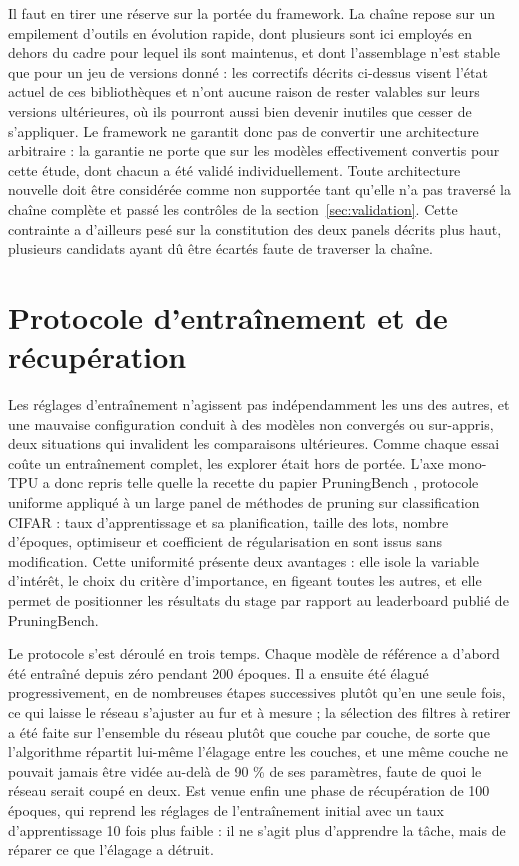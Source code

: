\documentclass[11pt,a4paper]{report}
\begin{document}
Il faut en tirer une réserve sur la portée du framework. La chaîne repose sur un empilement d'outils en évolution rapide, dont plusieurs sont ici employés en dehors du cadre pour lequel ils sont maintenus, et dont l'assemblage n'est stable que pour un jeu de versions donné : les correctifs décrits ci-dessus visent l'état actuel de ces bibliothèques et n'ont aucune raison de rester valables sur leurs versions ultérieures, où ils pourront aussi bien devenir inutiles que cesser de s'appliquer. Le framework ne garantit donc pas de convertir une architecture arbitraire : la garantie ne porte que sur les modèles effectivement convertis pour cette étude, dont chacun a été validé individuellement. Toute architecture nouvelle doit être considérée comme non supportée tant qu'elle n'a pas traversé la chaîne complète et passé les contrôles de la section~\ref{sec:validation}. Cette contrainte a d'ailleurs pesé sur la constitution des deux panels décrits plus haut, plusieurs candidats ayant dû être écartés faute de traverser la chaîne.

\section{Protocole d'entraînement et de récupération}
\label{sec:entrainement}

Les réglages d'entraînement n'agissent pas indépendamment les uns des autres, et une mauvaise configuration conduit à des modèles non convergés ou sur-appris, deux situations qui invalident les comparaisons ultérieures. Comme chaque essai coûte un entraînement complet, les explorer était hors de portée. L'axe mono-TPU a donc repris telle quelle la recette du papier PruningBench \cite{liComprehensiveStudyStructural2025}, protocole uniforme appliqué à un large panel de méthodes de pruning sur classification CIFAR : taux d'apprentissage et sa planification, taille des lots, nombre d'époques, optimiseur et coefficient de régularisation en sont issus sans modification. Cette uniformité présente deux avantages : elle isole la variable d'intérêt, le choix du critère d'importance, en figeant toutes les autres, et elle permet de positionner les résultats du stage par rapport au leaderboard publié de PruningBench.

Le protocole s'est déroulé en trois temps. Chaque modèle de référence a d'abord été entraîné depuis zéro pendant 200 époques. Il a ensuite été élagué progressivement, en de nombreuses étapes successives plutôt qu'en une seule fois, ce qui laisse le réseau s'ajuster au fur et à mesure ; la sélection des filtres à retirer a été faite sur l'ensemble du réseau plutôt que couche par couche, de sorte que l'algorithme répartit lui-même l'élagage entre les couches, et une même couche ne pouvait jamais être vidée au-delà de 90 \% de ses paramètres, faute de quoi le réseau serait coupé en deux. Est venue enfin une phase de récupération de 100 époques, qui reprend les réglages de l'entraînement initial avec un taux d'apprentissage 10 fois plus faible : il ne s'agit plus d'apprendre la tâche, mais de réparer ce que l'élagage a détruit.
\end{document}
